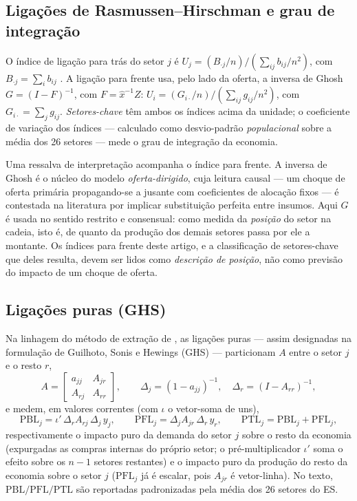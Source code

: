 \documentclass[11pt,a4paper]{article}
\begin{document}
\subsection{Ligações de Rasmussen--Hirschman e grau de integração}
\label{ap:rh}
O índice de ligação para trás do setor $j$ é
$U_j=(B_{\cdot j}/n)\big/(\sum_{ij}b_{ij}/n^2)$, com $B_{\cdot j}=\sum_i b_{ij}$
\citep{rasmussen1956,hirschman1958}. A ligação para frente usa, pelo lado da oferta, a
inversa de Ghosh $G=(I-F)^{-1}$, com $F=\hat{x}^{-1}Z$:
$U_i=(G_{i\cdot}/n)\big/(\sum_{ij}g_{ij}/n^2)$, com $G_{i\cdot}=\sum_j g_{ij}$.
\emph{Setores-chave} têm ambos os índices acima da unidade; o coeficiente de variação dos
índices --- calculado como desvio-padrão \emph{populacional} sobre a média dos 26 setores ---
mede o grau de integração da economia.

Uma ressalva de interpretação acompanha o índice para frente. A inversa de Ghosh é o núcleo
do modelo \emph{oferta-dirigido}, cuja leitura causal --- um choque de oferta primária
propagando-se a jusante com coeficientes de alocação fixos --- é contestada na literatura por
implicar substituição perfeita entre insumos. Aqui $G$ é usada no sentido restrito e
consensual: como medida da \emph{posição} do setor na cadeia, isto é, de quanto da produção
dos demais setores passa por ele a montante. Os índices para frente deste artigo, e a
classificação de setores-chave que deles resulta, devem ser lidos como \emph{descrição de
posição}, não como previsão do impacto de um choque de oferta.

\subsection{Ligações puras (GHS)}
\label{ap:puras}
Na linhagem do método de extração de \citet{cella1984}, as ligações puras --- assim
designadas na formulação de Guilhoto, Sonis e Hewings (GHS) \citep{guilhoto2005linkages} ---
particionam $A$ entre o setor $j$ e o resto $r$,
\begin{equation}
A=\begin{bmatrix} a_{jj} & A_{jr}\\ A_{rj} & A_{rr}\end{bmatrix},
\qquad \Delta_j=(1-a_{jj})^{-1},\quad \Delta_r=(I-A_{rr})^{-1},
\label{eq:ghs_part}
\end{equation}
e medem, em valores correntes (com $\iota$ o vetor-soma de uns),
\begin{equation}
\mathrm{PBL}_j=\iota'\,\Delta_r A_{rj}\,\Delta_j\,y_j,
\qquad
\mathrm{PFL}_j=\Delta_j A_{jr}\,\Delta_r\,y_r,
\qquad
\mathrm{PTL}_j=\mathrm{PBL}_j+\mathrm{PFL}_j,
\label{eq:ghs}
\end{equation}
respectivamente o impacto puro da demanda do setor $j$ sobre o resto da economia
(expurgadas as compras internas do próprio setor; o pré-multiplicador $\iota'$ soma o
efeito sobre os $n-1$ setores restantes) e o impacto puro da produção do resto da
economia sobre o setor $j$ ($\mathrm{PFL}_j$ já é escalar, pois $A_{jr}$ é vetor-linha). No
texto, $\mathrm{PBL}/\mathrm{PFL}/\mathrm{PTL}$ são reportadas padronizadas pela média dos 26
setores do ES.
\end{document}
